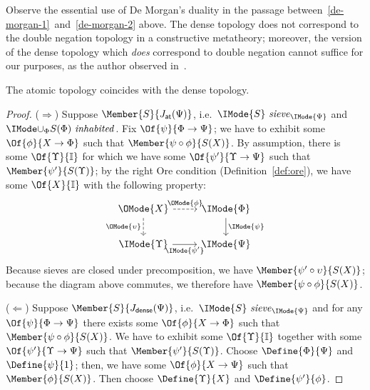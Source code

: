 \documentclass{article}
\newcommand\IsSieve[2]{\IMode{#2}\ \mathit{sieve}_{\IMode{#1}}}
\newcommand\JAtomic{J_{\mathsf{at}}}
\newcommand\JDense{J_{\mathsf{dense}}}
\begin{document}
\begin{remark}
  Observe the essential use of De Morgan's duality in the passage
  between~\ref{de-morgan-1}~and~\ref{de-morgan-2} above. The dense
  topology does not correspond to the double negation topology in a
  constructive metatheory; moreover, the version of the dense topology
  which \emph{does} correspond to double negation cannot suffice for
  our purposes, as the author observed
  in~\cite{sterling:math-stack-exchange-dense-topology}.
\end{remark}

\begin{lem}\label{lem:atomic-dense}
  The atomic topology coincides with the dense topology.
\end{lem}
\begin{proof}
  ($\Rightarrow$) Suppose $\Member{S}{\JAtomic(\Psi)}$, i.e.\
  $\IsSieve{\Psi}{S}$ and $\IsInh{\cup_\Phi S(\Phi)}$. Fix
  $\Of{\psi}{\Phi\to\Psi}$; we have to exhibit some
  $\Of{\phi}{X\to\Phi}$ such that $\Member{\psi\circ\phi}{S(X)}$.
  By assumption, there is some $\Of{\Upsilon}{\CatI}$ for which we
  have some $\Of{\psi'}{\Upsilon\to\Psi}$ such that
  $\Member{\psi'}{S(\Upsilon)}$; by the right Ore condition (Definition~\ref{def:ore}), we have
  some $\Of{X}{\CatI}$ with the following property:
  \[
    \begin{tikzcd}
      \OMode{X}
      \arrow[r,dashed,"\OMode{\phi}"]
      \arrow[d,dashed,swap,"\OMode{\upsilon}"]
      &
      \IMode{\Phi}
      \arrow[d,"\IMode{\psi}"]
      \\
      \IMode{\Upsilon}
      \arrow[r,swap,"\IMode{\psi'}"]
      &
      \IMode{\Psi}
    \end{tikzcd}
  \]
  Because sieves are closed under precomposition, we have
  $\Member{\psi'\circ \upsilon}{S(X)}$; because the diagram above
  commutes, we therefore have $\Member{\psi\circ\phi}{S(X)}$.

  ($\Leftarrow$) Suppose $\Member{S}{\JDense(\Psi)}$, i.e.\
  $\IsSieve{\Psi}{S}$ and for any $\Of{\psi}{\Phi\to\Psi}$ there
  exists some $\Of{\phi}{X\to\Phi}$ such that
  $\Member{\psi\circ\phi}{S(X)}$. We have to exhibit some
  $\Of{\Upsilon}{\CatI}$ together with some
  $\Of{\psi'}{\Upsilon\to\Psi}$ such that
  $\Member{\psi'}{S(\Upsilon)}$.
  Choose $\Define{\Phi}{\Psi}$ and $\Define{\psi}{1}$; then, we have
  some $\Of{\phi}{X\to\Psi}$ such that $\Member{\phi}{S(X)}$. Then
  choose $\Define{\Upsilon}{X}$ and $\Define{\psi'}{\phi}$.

\end{proof}
\end{document}
